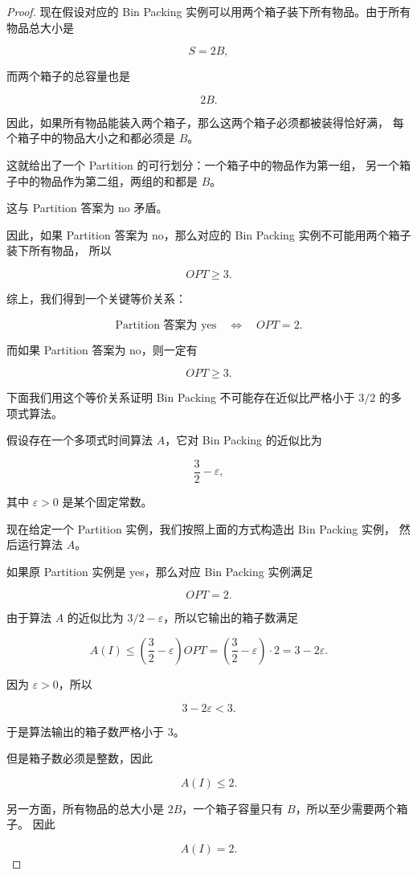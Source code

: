 \documentclass[UTF8,openany,12pt]{ctexbook}
\theoremstyle{remark}
\begin{document}
\begin{proof}
现在假设对应的 Bin Packing 实例可以用两个箱子装下所有物品。由于所有物品总大小是

$$
S=2B,
$$

而两个箱子的总容量也是

$$
2B.
$$

因此，如果所有物品能装入两个箱子，那么这两个箱子必须都被装得恰好满，
每个箱子中的物品大小之和都必须是 $B$。

这就给出了一个 Partition 的可行划分：一个箱子中的物品作为第一组，
另一个箱子中的物品作为第二组，两组的和都是 $B$。

这与 Partition 答案为 no 矛盾。

因此，如果 Partition 答案为 no，那么对应的 Bin Packing 实例不可能用两个箱子装下所有物品，
所以

$$
OPT \ge 3.
$$

综上，我们得到一个关键等价关系：

$$
\text{Partition 答案为 yes}
\quad\Longleftrightarrow\quad
OPT=2.
$$

而如果 Partition 答案为 no，则一定有

$$
OPT\ge 3.
$$

下面我们用这个等价关系证明 Bin Packing 不可能存在近似比严格小于 $3/2$ 的多项式算法。

假设存在一个多项式时间算法 $A$，它对 Bin Packing 的近似比为

$$
\frac{3}{2}-\varepsilon,
$$

其中 $\varepsilon>0$ 是某个固定常数。

现在给定一个 Partition 实例，我们按照上面的方式构造出 Bin Packing 实例，
然后运行算法 $A$。

如果原 Partition 实例是 yes，那么对应 Bin Packing 实例满足

$$
OPT=2.
$$

由于算法 $A$ 的近似比为 $3/2-\varepsilon$，所以它输出的箱子数满足

$$
A(I)
\le
\left(\frac{3}{2}-\varepsilon\right)OPT
=
\left(\frac{3}{2}-\varepsilon\right)\cdot 2
=
3-2\varepsilon.
$$

因为 $\varepsilon>0$，所以

$$
3-2\varepsilon < 3.
$$

于是算法输出的箱子数严格小于 $3$。

但是箱子数必须是整数，因此

$$
A(I)\le 2.
$$

另一方面，所有物品的总大小是 $2B$，一个箱子容量只有 $B$，所以至少需要两个箱子。
因此

$$
A(I)=2.
$$


\end{proof}
\end{document}
